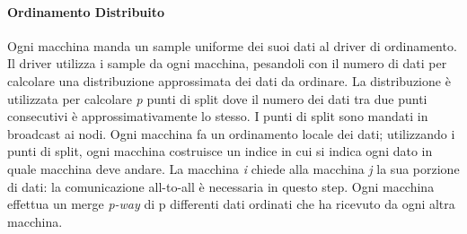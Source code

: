 \documentclass{article}
\begin{document}
\begin{appendices}
\paragraph{Ordinamento Distribuito}
Ogni macchina manda un sample uniforme dei suoi dati al driver di ordinamento. Il driver utilizza i sample da ogni macchina, pesandoli con il numero di dati per calcolare una distribuzione approssimata dei dati da ordinare. La distribuzione è utilizzata per calcolare \textit{p} punti di split dove il numero dei dati tra due punti consecutivi è approssimativamente lo stesso. I punti di split sono mandati in broadcast ai nodi. Ogni macchina fa un ordinamento locale dei dati; utilizzando i punti di split, ogni macchina costruisce un indice in cui si indica ogni dato in quale macchina deve andare. La macchina \textit{i} chiede alla macchina \textit{j} la sua porzione di dati: la comunicazione all-to-all è necessaria in questo step. Ogni macchina effettua un merge \textit{p-way} di p differenti dati ordinati che ha ricevuto da ogni altra macchina.


\end{appendices}
\end{document}
